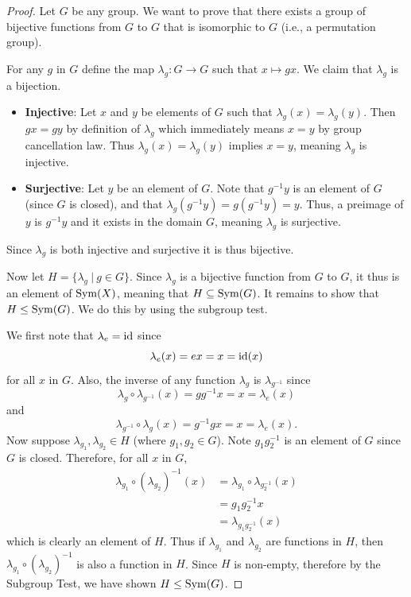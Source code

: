 \begin{proof}
    Let $G$ be any group. We want to prove that there exists a group of bijective functions from $G$ to $G$ that is isomorphic to $G$ (i.e., a permutation group).

    For any $g$ in $G$ define the map $\lambda_g: G \to G$ such that $x \mapsto gx$. We claim that $\lambda_g$ is a bijection.
    \begin{itemize}
        \item \textbf{Injective}: Let $x$ and $y$ be elements of $G$ such that $\lambda_g(x) = \lambda_g(y)$. Then $gx = gy$ by definition of $\lambda_g$ which immediately means $x = y$ by group cancellation law. Thus $\lambda_g(x) = \lambda_g(y)$ implies $x = y$, meaning $\lambda_g$ is injective.
        \item \textbf{Surjective}: Let $y$ be an element of $G$. Note that $g^{-1}y$ is an element of $G$ (since $G$ is closed), and that $\lambda_g(g^{-1}y) = g(g^{-1}y) = y$. Thus, a preimage of $y$ is $g^{-1}y$ and it exists in the domain $G$, meaning $\lambda_g$ is surjective.
    \end{itemize}
    Since $\lambda_g$ is both injective and surjective it is thus bijective.

    Now let $H = \{\lambda_g \ | \ g \in G\}$. Since $\lambda_g$ is a bijective function from $G$ to $G$, it thus is an element of $\mathrm{Sym}(X)$, meaning that $H \subseteq \mathrm{Sym}(G)$. It remains to show that $H \leq \mathrm{Sym}(G)$. We do this by using the subgroup test.

    We first note that $\lambda_e = \mathrm{id}$ since
    \[
        \lambda_e(x) = ex = x = \mathrm{id}(x)
    \]
    for all $x$ in $G$. Also, the inverse of any function $\lambda_g$ is $\lambda_{g^{-1}}$ since
    \[
        \lambda_g \circ \lambda_{g^{-1}}(x) = gg^{-1}x = x = \lambda_e(x)
    \]
    and
    \[
        \lambda_{g^{-1}} \circ \lambda_g(x) = g^{-1}gx = x = \lambda_e(x).
    \]
    Now suppose $\lambda_{g_1}, \lambda_{g_2} \in H$ (where $g_1, g_2 \in G$). Note $g_1g_2^{-1}$ is an element of $G$ since $G$ is closed. Therefore, for all $x$ in $G$,
    \begin{align*}
        \lambda_{g_1} \circ \left(\lambda_{g_2}\right)^{-1}(x) &= \lambda_{g_1}\circ\lambda_{g_2^{-1}}(x)\\
        &= g_1g_2^{-1}x\\
        &= \lambda_{g_1g_2^{-1}}(x)
    \end{align*}
    which is clearly an element of $H$. Thus if $\lambda_{g_1}$ and $\lambda_{g_2}$ are functions in $H$, then $\lambda_{g_1} \circ \left(\lambda_{g_2}\right)^{-1}$ is also a function in $H$. Since $H$ is non-empty, therefore by the Subgroup Test, we have shown $H \leq \mathrm{Sym}(G)$.


\end{proof}
